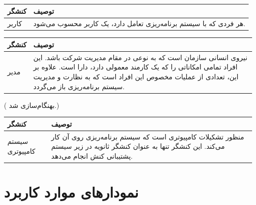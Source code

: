\begin{table}[H]
	\centering
	\begin{tabular}{|p{3cm}|p{8cm}|}
		\hline
		
		
		کنشگر	& توصیف  \\
		\hline
		کاربر &
		
		هر فردی که با سیستم  برنامه‌ریزی تعامل دارد، یک کاربر محسوب می‌شود.
		\\
		\hline
		
	\end{tabular}
\end{table}


\begin{table}[H]
	\centering
	\begin{tabular}{|p{3cm}|p{8cm}|}
		\hline
		
		
		کنشگر	& توصیف  \\
		\hline
		مدیر &
		
		نیروی انسانی سازمان است که به نوعی در مقام مدیریت شرکت باشد. این افراد تمامی امکاناتی را که یک کارمند معمولی  دارد، دارا است. علاوه بر این، تعدادی از عملیات مخصوص این افراد است که به نظارت و مدیریت سیستم برنامه‌ریزی باز می‌گردد.
		\\
		\hline
		
	\end{tabular}
\end{table}


({\color{red} بهنگام‌سازی شد.})
\begin{table}[H]
	\centering
	\begin{tabular}{|p{3cm}|p{8cm}|}
		\hline
		
		
		کنشگر	& توصیف  \\
		\hline
		سیستم کامپیوتری &
		
		منظور تشکیلات کامپیوتری است که سیستم برنامه‌ریزی روی آن کار می‌کند. این کنشگر تنها به عنوان کنشگر ثانویه در زیر سیستم پشتیبانی کنش انجام می‌دهد.
		\\
		\hline
		
	\end{tabular}
\end{table}


\newpage
\section{نمودارهای موارد کاربرد}

